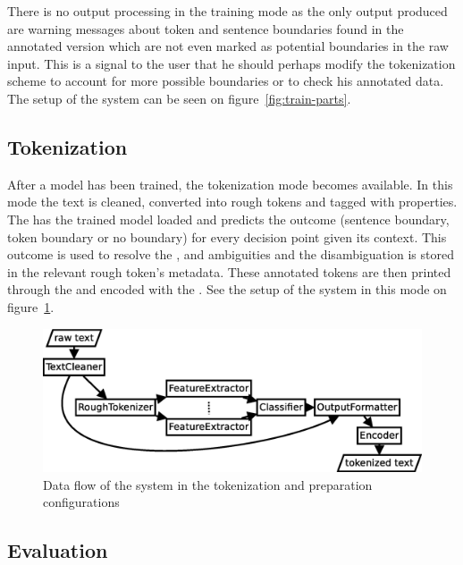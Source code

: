 There is no output processing in the training mode as the only output produced
are warning messages about token and sentence boundaries found in the annotated
version which are not even marked as potential boundaries in the raw input.
This is a signal to the user that he should perhaps modify the tokenization
scheme to account for more possible boundaries or to check his annotated data.
The setup of the system can be seen on figure~\ref{fig:train-parts}.

\subsection{Tokenization}
\label{ssec:impl-modes-tokenize}

After a model has been trained, the tokenization mode becomes available. In
this mode the text is cleaned, converted into rough tokens and tagged with
properties. The  has the trained model loaded and predicts
the outcome (sentence boundary, token boundary or no boundary) for every
decision point given its context. This outcome is used to resolve the
\maysplit{}, \mayjoin{} and \maybreaksentence{} ambiguities and the
disambiguation is stored in the relevant rough token's metadata. These
annotated tokens are then printed through the  and
encoded with the . See the setup of the system in this mode on
figure~\ref{fig:tokenize-parts}.

\begin{figure}
  \includegraphics[width=\textwidth]{img/tokenize-parts.eps}
  \caption{Data flow of the system in the tokenization and preparation
           configurations}
  \label{fig:tokenize-parts}
\end{figure}

\subsection{Evaluation}
\label{ssec:impl-modes-evaluate}

